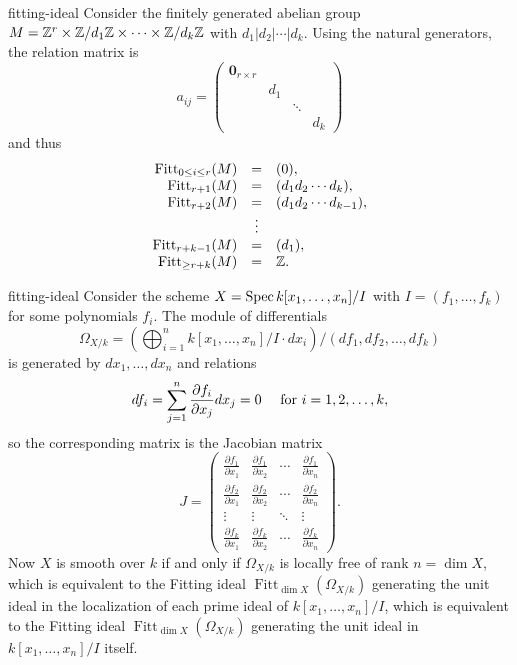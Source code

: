 \begin{example}{fitting-ideal}
    Consider the finitely generated abelian group $M = \mathbb{Z}^r \times \mathbb{Z} / d_1 \mathbb{Z} \times \cdots \times \mathbb{Z} / d_k \mathbb{Z}$ with $d_1 | d_2 | \cdots | d_k$. Using the natural generators, the relation matrix is
    \[ a_{ij} = \begin{pmatrix} \textbf{0}_{r \times r} & & &  \\  & d_1 & \\ & & \ddots & \\ & & & d_k \end{pmatrix} \]
    and thus
    \[ \begin{array}{rcl}
         \operatorname{Fitt}_{0 \le i \le r}(M) &=& (0) , \\
        \operatorname{Fitt}_{r + 1}(M) &=& (d_1 d_2\cdots d_k) , \\
        \operatorname{Fitt}_{r + 2}(M) &=& (d_1 d_2\cdots d_{k - 1}) , \\
        & \vdots & \\
        \operatorname{Fitt}_{r + k - 1}(M) &=& (d_1) , \\
        \operatorname{Fitt}_{\ge r + k}(M) &=& \mathbb{Z} .
    \end{array} \]
\end{example}

\begin{example}{fitting-ideal}
    Consider the scheme $X = \operatorname{Spec} k[x_1, \ldots, x_n] / I$ with $I = (f_1, \ldots, f_k)$ for some polynomials $f_i$. The module of differentials
    \[ \Omega_{X/k} = \left(\bigoplus_{i = 1}^{n} k[x_1, \ldots, x_n] / I \cdot dx_i \right) / (df_1, df_2, \ldots, df_k) \]
    is generated by $dx_1, \ldots, dx_n$ and relations
    \[ df_i = \sum_{j = 1}^{n} \frac{\partial f_i}{\partial x_j} dx_j = 0 \quad \textup{ for } i = 1, 2, \ldots, k , \]
    so the corresponding matrix is the Jacobian matrix
    \[ J = \begin{pmatrix}
        \frac{\partial f_1}{\partial x_1} & \frac{\partial f_1}{\partial x_2} & \cdots & \frac{\partial f_1}{\partial x_n} \\
        \frac{\partial f_2}{\partial x_1} & \frac{\partial f_2}{\partial x_2} & \cdots & \frac{\partial f_2}{\partial x_n} \\
        \vdots & \vdots & \ddots & \vdots \\
        \frac{\partial f_k}{\partial x_1} & \frac{\partial f_k}{\partial x_2} & \cdots & \frac{\partial f_k}{\partial x_n}
    \end{pmatrix} . \]
    Now $X$ is smooth over $k$ if and only if $\Omega_{X/k}$ is locally free of rank $n = \dim X$, which is equivalent to the Fitting ideal $\operatorname{Fitt}_{\dim X}(\Omega_{X/k})$ generating the unit ideal in the localization of each prime ideal of $k[x_1, \ldots, x_n] / I$, which is equivalent to the Fitting ideal $\operatorname{Fitt}_{\dim X}(\Omega_{X/k})$ generating the unit ideal in $k[x_1, \ldots, x_n] / I$ itself.
\end{example}

